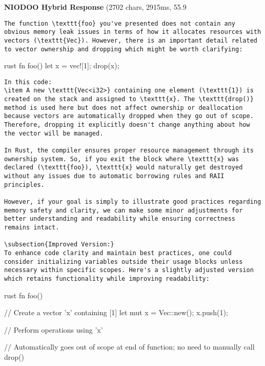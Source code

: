 \documentclass[11pt,a4paper]{article}
\begin{document}
\textbf{NIODOO Hybrid Response} (2702 chars, 2915ms, 55.9%
\begin{verbatim}The function \texttt{foo} you've presented does not contain any obvious memory leak issues in terms of how it allocates resources with vectors (\texttt{Vec}). However, there is an important detail related to vector ownership and dropping which might be worth clarifying:

\end{verbatim}rust
fn foo() {
    let x = vec![1];
    drop(x);
}
\begin{verbatim}
In this code:
\item A new \texttt{Vec<i32>} containing one element (\texttt{1}) is created on the stack and assigned to \texttt{x}. The \texttt{drop()} method is used here but does not affect ownership or deallocation because vectors are automatically dropped when they go out of scope. Therefore, dropping it explicitly doesn't change anything about how the vector will be managed.

In Rust, the compiler ensures proper resource management through its ownership system. So, if you exit the block where \texttt{x} was declared (\texttt{foo}), \texttt{x} would naturally get destroyed without any issues due to automatic borrowing rules and RAII principles.

However, if your goal is simply to illustrate good practices regarding memory safety and clarity, we can make some minor adjustments for better understanding and readability while ensuring correctness remains intact.

\subsection{Improved Version:}
To enhance code clarity and maintain best practices, one could consider initializing variables outside their usage blocks unless necessary within specific scopes. Here's a slightly adjusted version which retains functionality while improving readability:

\end{verbatim}rust
fn foo() {
    // Create a vector 'x' containing [1]
    let mut x = Vec::new();
    x.push(1);

    // Perform operations using 'x'
    
    // Automatically goes out of scope at end of function; no need to manually call drop()
}
\end{document}
